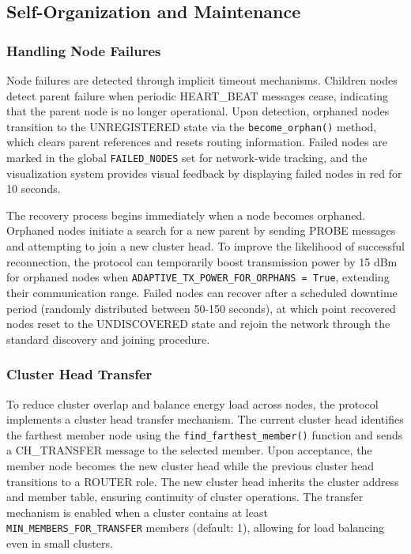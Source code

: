 \documentclass[conference]{IEEEtran}
\begin{document}
\subsection{Self-Organization and Maintenance}

\subsubsection{Handling Node Failures}
Node failures are detected through implicit timeout mechanisms. Children nodes detect parent failure when periodic HEART\_BEAT messages cease, indicating that the parent node is no longer operational. Upon detection, orphaned nodes transition to the UNREGISTERED state via the \texttt{become\_orphan()} method, which clears parent references and resets routing information. Failed nodes are marked in the global \texttt{FAILED\_NODES} set for network-wide tracking, and the visualization system provides visual feedback by displaying failed nodes in red for 10 seconds.

The recovery process begins immediately when a node becomes orphaned. Orphaned nodes initiate a search for a new parent by sending PROBE messages and attempting to join a new cluster head. To improve the likelihood of successful reconnection, the protocol can temporarily boost transmission power by 15 dBm for orphaned nodes when \texttt{ADAPTIVE\_TX\_POWER\_FOR\_ORPHANS = True}, extending their communication range. Failed nodes can recover after a scheduled downtime period (randomly distributed between 50-150 seconds), at which point recovered nodes reset to the UNDISCOVERED state and rejoin the network through the standard discovery and joining procedure.

\subsubsection{Cluster Head Transfer}
To reduce cluster overlap and balance energy load across nodes, the protocol implements a cluster head transfer mechanism. The current cluster head identifies the farthest member node using the \texttt{find\_farthest\_member()} function and sends a CH\_TRANSFER message to the selected member. Upon acceptance, the member node becomes the new cluster head while the previous cluster head transitions to a ROUTER role. The new cluster head inherits the cluster address and member table, ensuring continuity of cluster operations. The transfer mechanism is enabled when a cluster contains at least \texttt{MIN\_MEMBERS\_FOR\_TRANSFER} members (default: 1), allowing for load balancing even in small clusters.
\end{document}
